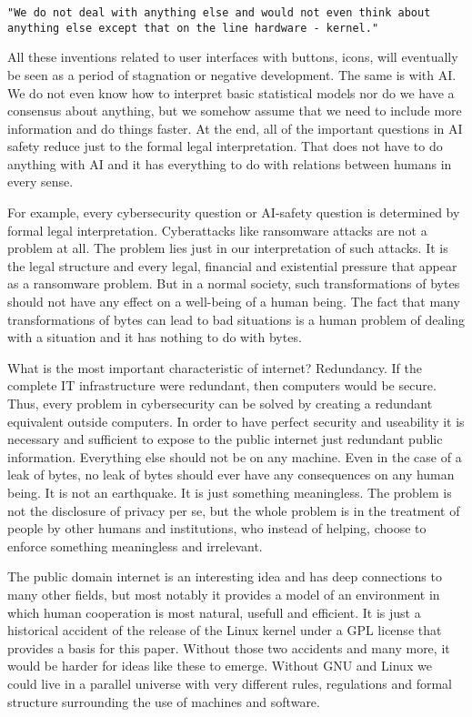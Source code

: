 \documentclass{article}
\begin{document}
\texttt{"We do not deal with anything else and would not even think about
anything  else except that on the line hardware - kernel."} 

All these inventions related to user interfaces with buttons, icons, will 
eventually be seen as a period of stagnation or negative development.
The same is with AI. We do not even know how to interpret basic statistical
models nor do we have a consensus about anything, but we somehow assume that
we need to include more information and do things faster.
At the end, all of the important questions in AI safety reduce just to the
formal legal interpretation. That does not have to do anything with AI and 
it has everything to do with relations between humans in every sense.

For example, every cybersecurity question or AI-safety question is determined
by formal legal interpretation. Cyberattacks like ransomware attacks
are not a problem at all. The problem lies just in our interpretation of such
attacks. It is the legal structure and every legal, financial and existential
pressure that appear as a ransomware problem. But in a normal society, such
transformations of bytes should not have any effect on a well-being of a human
being. The fact that many transformations of bytes can lead to bad situations
is a human problem of dealing with a situation and it has nothing to do with
bytes. 

What is the most important characteristic of internet? Redundancy. If the
complete IT infrastructure were redundant, then computers would be secure.
Thus, every problem in cybersecurity can be solved by creating a redundant
equivalent outside computers. In order to have perfect security and 
useability it is necessary and sufficient to expose to the public internet
just redundant public information. Everything else should not be on any machine.
Even in the case of a leak of bytes, no leak of bytes should ever have any
consequences on any human being. It is not an earthquake. It is just something
meaningless. The problem is not the disclosure of privacy per se, but the
whole problem is in the treatment of people by other humans and institutions,
who instead of helping, choose to enforce something meaningless and irrelevant. 

The public domain internet is an interesting idea and has deep connections to
many other fields, but most notably it provides a model of an environment in
which human cooperation is most natural, usefull and efficient. It is just
a historical accident of the release of the Linux kernel under a GPL license
that provides a basis for this paper. Without those two accidents and many
more, it would be harder for ideas like these to emerge. Without GNU and Linux
we could live in a parallel universe with very different rules, regulations
and formal structure surrounding the use of machines and software. 
\end{document}
